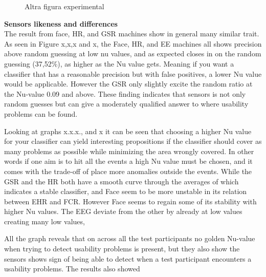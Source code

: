 \begin{figure}[h!]
\begin{minipage}[t]{0.5\textwidth}
    \caption{Altra figura experimental}
    \label{fase2}
  \end{minipage}
\end{figure}

\textbf{Sensors likeness and differences}\\
The result from face, HR, and GSR machines show in general many similar trait.
As seen in Figure x,x,x and x, the Face, HR, and EE machines all shows precision above random guessing at low nu values, and as expected closes in on the random guessing (37,52\%), as higher as the Nu value gets. Meaning if you want a classifier that has a reasonable precision but with false positives, a lower Nu value would be applicable. However the GSR only slightly excite the random ratio at the Nu-value 0.09 and above.
These finding indicates that sensors is not only random guesses but can give a moderately qualified answer to where usability problems can be found.

Looking at graphs x.x.x., and x it can be seen that choosing a higher Nu value for your classifier can yield interesting propositions if the classifier should cover as many problems as possible while minimizing the area wrongly covered.
In other words if one aim is to hit all the events a high Nu value must be chosen, and it comes with the trade-off of place more anomalies outside the events. 
While the GSR and the HR both have a smooth curve through the averages of which indicates a stable classifier, and Face seem to be more unstable in its relation between EHR and FCR. However Face seems to regain some of its stability with higher Nu values. The EEG deviate from the other by already at low values creating many low values, 

All the graph reveals that on across all the test participants no golden Nu-value when trying to detect usability problems is present, but they also show the sensors shows sign of being able to detect when a test participant encounters a usability problems.
The results also showed 
